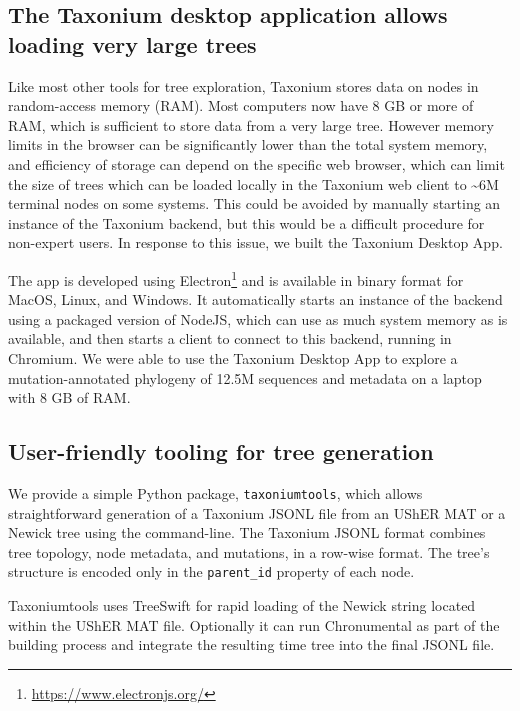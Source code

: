 \subsection*{The Taxonium desktop application allows loading very large trees}

Like most other tools for tree exploration, Taxonium stores data on nodes in random-access memory (RAM). Most computers now have 8 GB or more of RAM, which is sufficient to store data from a very large tree. However memory limits in the browser can be significantly lower than the total system memory, and efficiency of storage can depend on the specific web browser, which can limit the size of trees which can be loaded locally in the Taxonium web client to \textasciitilde{}6M terminal nodes on some systems. This could be avoided by manually starting an instance of the Taxonium backend, but this would be a difficult procedure for non-expert users. In response to this issue, we built the Taxonium Desktop App.

The app is developed using Electron\footnote{\url{https://www.electronjs.org/}} and is available in binary format for MacOS, Linux, and Windows. It automatically starts an instance of the backend using a packaged version of NodeJS, 
which can use as much system memory as is available, and then starts a client to connect to this backend, running in Chromium. We were able to use the Taxonium Desktop App to explore a mutation-annotated phylogeny of 12.5M sequences and metadata on a laptop with 8 GB of RAM.



\subsection*{User-friendly tooling for tree generation}

We provide a simple Python package, \texttt{taxoniumtools}, which allows straightforward generation of a Taxonium JSONL file from an UShER MAT or a Newick tree using the command-line. The Taxonium JSONL format combines tree topology, node metadata, and mutations, in a row-wise format. The tree's structure is encoded only in the \texttt{parent\_id} property of each node.

Taxoniumtools uses TreeSwift \citep{moshiri2020treeswift} for rapid loading of the Newick string located within the UShER MAT file. Optionally it can run Chronumental \citep{chronumental} as part of the building process and integrate the resulting time tree into the final JSONL file.

